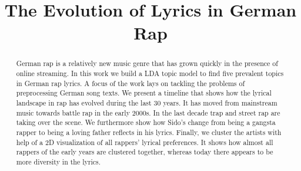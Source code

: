 \documentclass[conference]{IEEEtran}
\begin{document}
\title{The Evolution of Lyrics in German Rap}


\author{
}

\maketitle

\begin{abstract}
German rap is a relatively new music genre that has grown quickly in the presence of online streaming. In this work we build a LDA topic model to find five prevalent topics in German rap lyrics. A focus of the work lays on tackling the problems of preprocessing German song texts. We present a timeline that shows how the lyrical landscape in rap has evolved during the last 30 years. It has moved from mainstream music towards battle rap in the early 2000s. In the last decade trap and street rap are taking over the scene. We furthermore show how Sido's change from being a gangsta rapper to being a loving father reflects in his lyrics. Finally, we cluster the artists with help of a 2D visualization of all rappers' lyrical preferences. It shows how almost all rappers of the early years are clustered together, whereas today there appears to be more diversity in the lyrics.
\end{abstract}
\end{document}
